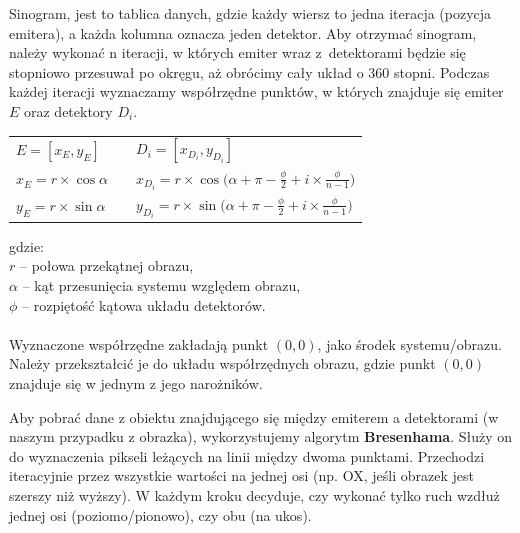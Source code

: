 \documentclass[polish,polish,a4paper]{article}
\begin{document}
				Sinogram, jest to tablica danych, 
				gdzie każdy wiersz to jedna iteracja (pozycja emitera), 
				a każda kolumna oznacza jeden detektor.
				Aby otrzymać sinogram, należy wykonać n iteracji, 
				w których emiter wraz z~detektorami będzie się stopniowo przesuwał po okręgu, 
				aż obrócimy cały układ o 360 stopni. 
				Podczas każdej iteracji wyznaczamy współrzędne punktów, w których znajduje się emiter $E$ oraz detektory $D_i$.
				\begin{center}
					\begin{tabular} {l l l}
						$ E = [ x_E, y_E ] $ 	& \hspace{2cm}	 &	$ D_i = [x_{D_i}, y_{D_i}] $
						\\
						$ x_E = r \times \cos{\alpha} $ 	& \hspace{2cm}	 &	 $ x_{D_i} = r \times \cos{\big(\alpha + \pi - \frac{\phi}{2} + i \times \frac{\phi}{n-1}\big)} $
						 \\ 
						$ y_E = r \times \sin{\alpha} $ 	& \hspace{2cm}	 &	 $ y_{D_i} =  r \times \sin{\big(\alpha + \pi - \frac{\phi}{2} + i \times \frac{\phi}{n-1}\big)}$ 
						\\
					\end{tabular}
				\end{center}
				gdzie: \\
				\indent $r$ -- połowa przekątnej obrazu, \\
				\indent $\alpha$ -- kąt przesunięcia systemu względem obrazu, \\
				\indent $\phi$ -- rozpiętość kątowa układu detektorów. \\ \\
				Wyznaczone współrzędne zakładają punkt $(0,0)$, jako środek systemu/obrazu.
				 Należy przekształcić je do układu współrzędnych obrazu,
				  gdzie punkt $(0,0)$ znajduje się w jednym z jego narożników.
				
				Aby pobrać dane z obiektu znajdującego się między emiterem a detektorami (w naszym przypadku z obrazka),
				 wykorzystujemy algorytm \textbf{Bresenhama}.
				  Służy on do wyznaczenia pikseli leżących na linii między dwoma punktami. 
				  Przechodzi iteracyjnie przez wszystkie wartości na jednej osi
				   (np. OX, jeśli obrazek jest szerszy niż wyższy).
				    W każdym kroku decyduje,
				     czy wykonać tylko ruch wzdłuż jednej osi (poziomo/pionowo), czy obu (na ukos).
				
\end{document}
